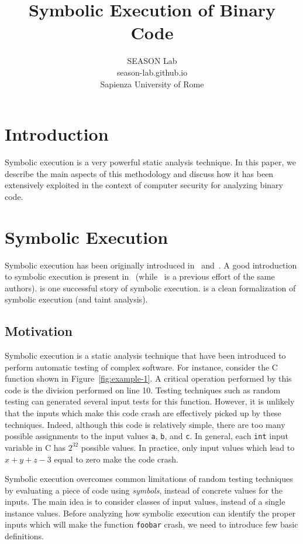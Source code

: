 \documentclass[10pt, a4paper]{article}
\title{Symbolic Execution of Binary Code}
\author{SEASON Lab  \\
season-lab.github.io \\
Sapienza University of Rome  \\
}
\date{}
\begin{document}
\maketitle

\setcounter{tocdepth}{2}
\tableofcontents

\newpage
\section{Introduction}

Symbolic execution is a very powerful static analysis technique. In this paper, we describe the main aspects of this methodology and discuss how it has been extensively exploited in the context of computer security for analyzing binary code.

\section{Symbolic Execution}

Symbolic execution has been originally introduced in~\cite{K-ACM76} and~\cite{H-TSE77}. A good introduction to symbolic execution is present in~\cite{KLEE-OSDI08} (while~\cite{EXE-CCS06} is a previous effort of the same authors). \cite{SAGE-NDSS08} is one successful story of symbolic execution. \cite{SAB-SP10} is a clean formalization of symbolic execution (and taint analysis).

\subsection{Motivation}

Symbolic execution is a static analysis technique that have been introduced to perform automatic testing of complex software. For instance, consider the C function shown in Figure~\ref{fig:example-1}. A critical operation performed by this code is the division performed on line 10. Testing techniques such as random testing can generated several input tests for this function. However, it is unlikely that the inputs which make this code crash are effectively picked up by these techniques. Indeed, although this code is relatively simple, there are too many possible assignments to the input values {\tt a}, {\tt b}, and {\tt c}. In general, each {\tt int} input variable in C has $2^{32}$ possible values. In practice, only input values which lead to $x + y + z - 3$ equal to zero make the code crash.

Symbolic execution overcomes common limitations of random testing techniques by evaluating a piece of code using {\em symbols}, instead of concrete values for the inputs. The main idea is to consider classes of input values, instead of a single instance values. Before analyzing how symbolic execution can identify the proper inputs which will make the function {\tt foobar} crash, we need to introduce few basic definitions.
\end{document}
